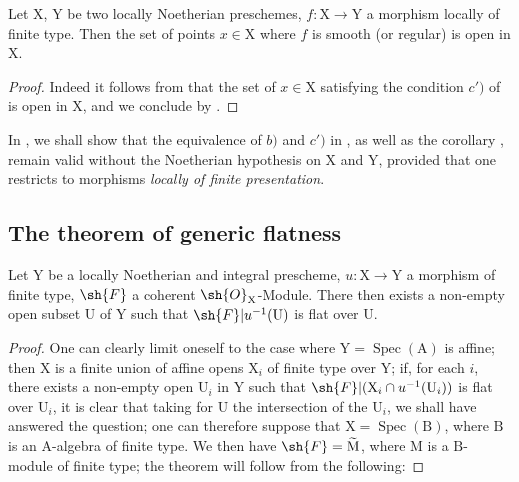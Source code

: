 \begin{corollary}[6.8.7]
\label{IV.6.8.7}
Let $\mathrm{X}$, $\mathrm{Y}$ be two locally Noetherian preschemes, $f:\mathrm{X}\to\mathrm{Y}$ a morphism locally of finite type. Then the set of points $x\in\mathrm{X}$ where $f$ is smooth \textnormal{(}or regular\textnormal{)} is open in $\mathrm{X}$.
\end{corollary}

\begin{proof}
Indeed it follows from  that the set of $x\in\mathrm{X}$ satisfying the condition $c')$ of  is open in $\mathrm{X}$, and we conclude by .
\end{proof}

\begin{remark}[6.8.8]
\label{IV.6.8.8}
In , we shall show that the equivalence of $b)$ and $c')$ in , as well as the corollary , remain valid without the Noetherian hypothesis on $\mathrm{X}$ and $\mathrm{Y}$, provided that one restricts to morphisms \emph{locally of finite presentation}.
\end{remark}

\subsection{The theorem of generic flatness}
\label{subsection:IV.6.9}


\begin{theorem}[6.9.1]
\label{IV.6.9.1}
Let $\mathrm{Y}$ be a locally Noetherian and integral prescheme, $u:\mathrm{X}\to\mathrm{Y}$ a morphism of finite type, $\sh{F}$ a coherent $\sh{O}_\mathrm{X}$-Module. There then exists a non-empty open subset $\mathrm{U}$ of $\mathrm{Y}$ such that $\sh{F}|u^{-1}(\mathrm{U})$ is flat over $\mathrm{U}$.
\end{theorem}

\begin{proof}
One can clearly limit oneself to the case where $\mathrm{Y}=\operatorname{Spec}(\mathrm{A})$ is affine; then $\mathrm{X}$ is a finite union of affine opens $\mathrm{X}_i$ of finite type over $\mathrm{Y}$; if, for each $i$, there exists a non-empty open $\mathrm{U}_i$ in $\mathrm{Y}$ such that $\sh{F}|(\mathrm{X}_i\cap u^{-1}(\mathrm{U}_i))$ is flat over $\mathrm{U}_i$, it is clear that taking for $\mathrm{U}$ the intersection of the $\mathrm{U}_i$, we shall have answered the question; one can therefore suppose that $\mathrm{X}=\operatorname{Spec}(\mathrm{B})$, where $\mathrm{B}$ is an $\mathrm{A}$-algebra of finite type. We then have $\sh{F}=\widetilde{\mathrm{M}}$, where $\mathrm{M}$ is a $\mathrm{B}$-module of finite type; the theorem will follow from the following:
\end{proof}


